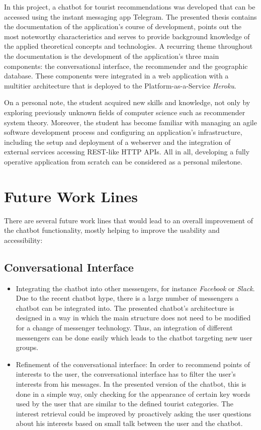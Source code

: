 
In this project, a chatbot for tourist recommendations was developed that can be accessed using the instant messaging app Telegram. The presented thesis contains the documentation of the application’s course of development, points out the most noteworthy characteristics and serves to provide background knowledge of the applied theoretical concepts and technologies. A recurring theme throughout the documentation is the development of the application’s three main components: the conversational interface, the recommender and the geographic database. These components were integrated in a web application with a multitier architecture that is deployed to the Platform-as-a-Service \textit{Heroku}.

On a personal note, the student acquired new skills and knowledge, not only by exploring previously unknown fields of computer science such as recommender system theory. Moreover, the student has become familiar with managing an agile software development process and configuring an application’s infrastructure, including the setup and deployment of a webserver and the integration of external services accessing REST-like HTTP APIs. All in all, developing a fully operative application from scratch can be considered as a personal milestone. 

\section{Future Work Lines}
There are several future work lines that would lead to an overall improvement of the chatbot functionality, mostly helping to improve the usability and accessibility:

\subsection{Conversational Interface}
\begin{itemize}
\item Integrating the chatbot into other messengers, for instance \textit{Facebook} or \textit{Slack}. Due to the recent chatbot hype, there is a large number of messengers a chatbot can be integrated into. The presented chatbot’s architecture is designed in a way in which the main structure does not need to be modified for a change of messenger technology. Thus, an integration of different messengers can be done easily which leads to the chatbot targeting new user groups.

\item Refinement of the conversational interface: In order to recommend points of interests to the user, the conversational interface has to filter the user’s interests from his messages. In the presented version of the chatbot, this is done in a simple way, only checking for the appearance of certain key words used by the user that are similar to the defined tourist categories. The interest retrieval could be improved by proactively asking the user questions about his interests based on small talk between the user and the chatbot.
\end{itemize}


